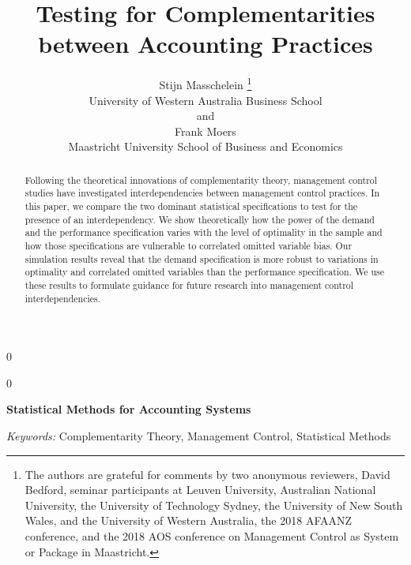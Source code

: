 \documentclass[12pt]{article}
\newcommand{\blind}{0}
\begin{document}
\def\spacingset#1{\renewcommand{\baselinestretch}%
{#1}\small\normalsize} \spacingset{1}


\blind
{
  \title{\bf Testing for Complementarities between Accounting Practices}

  \author{
        Stijn Masschelein \thanks{The authors are grateful for comments by two anonymous reviewers, David Bedford, seminar participants at Leuven University, Australian National University, the University of Technology Sydney, the University of New South Wales, and the University of Western Australia, the 2018 AFAANZ conference, and the 2018 AOS conference on Management Control as System or Package in Maastricht.} \\
    University of Western Australia Business School\\
     and \\     Frank Moers \\
    Maastricht University School of Business and Economics\\
      }
  \maketitle
} \fi

\blind
{
  \bigskip
  \bigskip
  \bigskip
  \begin{center}
    {\LARGE\bf Statistical Methods for Accounting Systems}
  \end{center}
  \medskip
} \fi

\bigskip
\begin{abstract}
Following the theoretical innovations of complementarity theory, management control studies have investigated  interdependencies between management control practices. In this paper, we compare the two dominant statistical specifications to test for the presence of an interdependency. We show theoretically how the power of the demand and the performance specification varies with the level of optimality in the sample and how those specifications are vulnerable to correlated omitted variable bias. Our simulation results reveal that the demand specification is more robust to variations in optimality and correlated omitted variables than the performance specification. We use these results to formulate guidance for future research into management control interdependencies.
\end{abstract}

\noindent%
{\it Keywords:} Complementarity Theory, Management Control, Statistical Methods
\vfill
\end{document}
